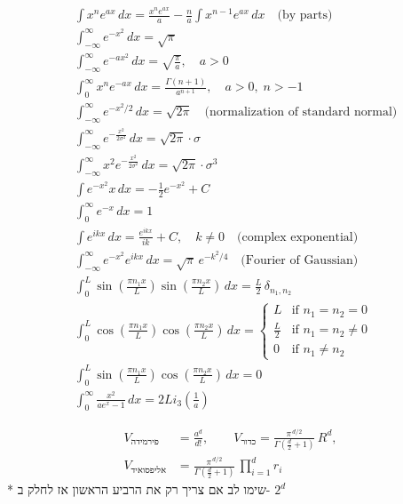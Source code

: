 \begin{cheatformula}[אינטרגרלים]
\begin{align*}
& \int x^n e^{ax} \, dx = \frac{x^n e^{ax}}{a} - \frac{n}{a} \int x^{n-1} e^{ax} \, dx \quad \text{(by parts)} \\[8pt]
& \int_{-\infty}^{\infty} e^{-x^2} \, dx = \sqrt{\pi} \\[8pt]
& \int_{-\infty}^{\infty} e^{-a x^2} \, dx = \sqrt{\frac{\pi}{a}}, \quad a > 0 \\[8pt]
& \int_{0}^{\infty} x^{n} e^{-a x} \, dx = \frac{\Gamma(n+1)}{a^{n+1}}, \quad a > 0,\; n > -1 \\[8pt]
& \int_{-\infty}^{\infty} e^{-x^2/2} \, dx = \sqrt{2\pi} \quad \text{(normalization of standard normal)} \\[8pt]
& \int_{-\infty}^{\infty} e^{-\frac{x^2}{2\sigma ^2}} \, dx = \sqrt{2\pi} \cdot \sigma \\[8pt]
& \int_{-\infty}^{\infty} x^2 e^{-\frac{x^2}{2\sigma ^2}} \, dx = \sqrt{2\pi} \cdot \sigma ^3 \\[8pt]
& \int e^{-x^2} x \, dx = -\frac{1}{2} e^{-x^2} + C \\[8pt]
& \int_{0}^{\infty} e^{-x} \, dx = 1 \\[8pt]
& \int e^{i k x} \, dx = \frac{e^{i k x}}{i k} + C, \quad k \neq 0 \quad \text{(complex exponential)} \\[8pt]
& \int_{-\infty}^{\infty} e^{-x^2} e^{i k x} \, dx = \sqrt{\pi} \, e^{-k^2/4} \quad \text{(Fourier of Gaussian)} \\[8pt]
& \int_0^L \sin\left( \frac{\pi n_1 x}{L} \right) \sin\left( \frac{\pi n_2 x}{L} \right) \, dx = \frac{L}{2} \, \delta_{n_1, n_2} \\[8pt]
& \int_0^L \cos\left( \frac{\pi n_1 x}{L} \right) \cos\left( \frac{\pi n_2 x}{L} \right) \, dx = 
\begin{cases}
L & \text{if } n_1 = n_2 = 0 \\
\frac{L}{2} & \text{if } n_1 = n_2 \neq 0 \\
0 & \text{if } n_1 \ne n_2
\end{cases} \\[8pt]
& \int_0^L \sin\left( \frac{\pi n_1 x}{L} \right) \cos\left( \frac{\pi n_2 x}{L} \right) \, dx = 0 \\
& \int_0^\infty \frac{x^2}{ae^x - 1} \, dx = 2 Li_3\left( \frac{1}{a} \right)
\end{align*}

\end{cheatformula}


\begin{cheatformula}
     \begin{align*}
    V_{\text{פירמידה}} &= \frac{a^{d}}{d!}, \qquad
    V_{\text{כדור}} = \frac{\pi^{\,d/2}}{\Gamma\left(\tfrac{d}{2} + 1\right)} \, R^{d}, \\
    V_{\text{אליפסואיד}} &= \frac{\pi^{\,d/2}}{\Gamma\left(\tfrac{d}{2} + 1\right)} \, \prod_{i=1}^{d} r_{i}
\end{align*}
* שימו לב אם צריך רק את הרביע הראשון אז לחלק ב- $2^d$

\end{cheatformula}

